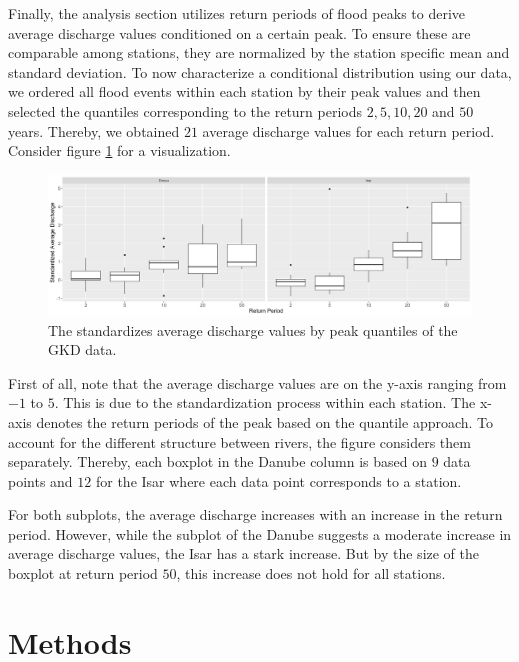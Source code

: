 \documentclass[
]{krantz}
\begin{document}
Finally, the analysis section utilizes return periods of flood peaks to derive
average discharge values conditioned on a certain peak.
To ensure these are
comparable among stations, they are normalized by the station specific mean and standard deviation.
To now characterize a conditional distribution using our data, we ordered all flood events within each station
by their peak values and then selected the quantiles corresponding to the
return periods \(2, 5, 10, 20\) and \(50\) years.
Thereby, we obtained \(21\) average discharge values for each return period.
Consider figure \ref{fig:condEmpBoxplots} for a visualization.

\begin{figure}

{\centering \includegraphics{work/04-floodfreq/figures/data_condBoxplots} 

}

\caption{The standardizes average discharge values by peak quantiles of the GKD data.}\label{fig:condEmpBoxplots}
\end{figure}

First of all, note that the average discharge values are on the
y-axis ranging from \(-1\) to \(5\). This is due to the
standardization process within each station. The x-axis denotes the
return periods of the peak based on the quantile approach.
To account for the different structure between rivers, the figure considers them separately.
Thereby, each boxplot in the Danube column is based on \(9\) data points and \(12\) for the Isar where each data
point corresponds to a station.

For both subplots, the average discharge increases with an increase in the return period.
However, while the subplot of the Danube suggests a moderate increase in average discharge values,
the Isar has a stark increase. But by the size of the boxplot at return period \(50\), this increase does not
hold for all stations.

\section{Methods}\label{methods}
\end{document}
